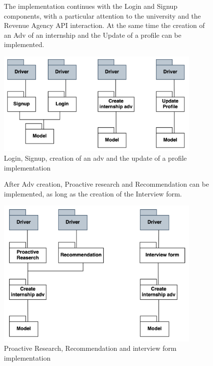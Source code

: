 \begin{figure}[H]
The implementation continues with the Login and Signup components, with a particular attention to the university and the Revenue Agency API interaction. At the same time the creation of an Adv of an internship and the Update of a profile can be implemented.\newline
    \begin{center}
        \includegraphics[width=10cm]{images/IntegrationStrategy/login_signup_adv_update.png}
        \caption{Login, Signup, creation of an adv and the update of a profile implementation}
    \end{center}
\end{figure}

\begin{figure}[H]
After Adv creation, Proactive research and Recommendation can be implemented, as long as the creation of the Interview form.\newline
    \begin{center}
        \includegraphics[width=10cm]{images/IntegrationStrategy/proac_recom_intForm.png}
        \caption{Proactive Research, Recommendation and interview form implementation}
    \end{center}
\end{figure}

